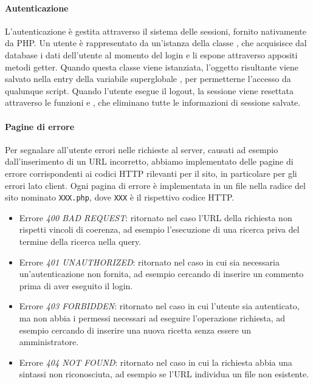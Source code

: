 \paragraph{Autenticazione}

L'autenticazione è gestita attraverso il sistema delle sessioni, fornito nativamente da PHP\@.
Un utente è rappresentato da un'istanza della classe , che acquisisce dal database i dati dell'utente al momento del login e li espone attraverso appositi metodi getter.
Quando questa classe viene istanziata, l'oggetto risultante viene salvato nella entry  della variabile superglobale , per permetterne l'accesso da qualunque script.
Quando l'utente esegue il logout, la sessione viene resettata attraverso le funzioni  e , che eliminano tutte le informazioni di sessione salvate.

\paragraph{Pagine di errore}

Per segnalare all'utente errori nelle richieste al server, causati ad esempio dall'inserimento di un URL incorretto, abbiamo implementato delle pagine di errore corrispondenti ai codici HTTP rilevanti per il sito, in particolare per gli errori lato client.
Ogni pagina di errore è implementata in un file nella radice del sito nominato \texttt{XXX.php}, dove \texttt{XXX} è il rispettivo codice HTTP\@.

\begin{itemize}
	\item Errore \textit{400 BAD REQUEST}: ritornato nel caso l'URL della richiesta non rispetti vincoli di coerenza, ad esempio l'esecuzione di una ricerca priva del termine della ricerca nella query.
	\item Errore \textit{401 UNAUTHORIZED}: ritornato nel caso in cui sia necessaria un'autenticazione non fornita, ad esempio cercando di inserire un commento prima di aver eseguito il login.
	\item Errore \textit{403 FORBIDDEN}: ritornato nel caso in cui l'utente sia autenticato, ma non abbia i permessi necessari ad eseguire l'operazione richiesta, ad esempio cercando di inserire una nuova ricetta senza essere un amministratore.
	\item Errore \textit{404 NOT FOUND}: ritornato nel caso in cui la richiesta abbia una sintassi non riconosciuta, ad esempio se l'URL individua un file non esistente.
\end{itemize}

